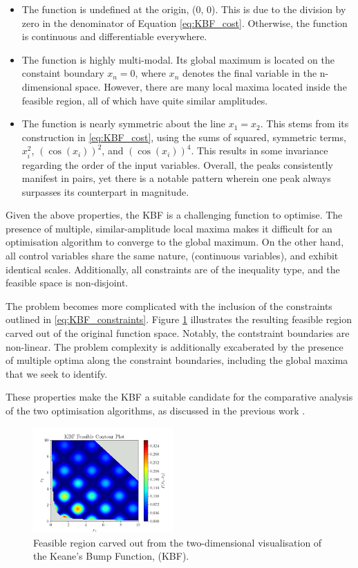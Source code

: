 \documentclass[10pt]{article}
\begin{document}
\begin{multicols}{2}
\begin{itemize}
    \item The function is undefined at the origin, (0, 0). This is due to the division by zero in the denominator of Equation \ref{eq:KBF_cost}. Otherwise, the function is continuous and differentiable everywhere.
    \item The function is highly multi-modal. Its global maximum is located on the constaint boundary $x_{n}=0$, where $x_n$ denotes the final variable in the n-dimensional space. However, there are many local maxima located inside the feasible region, all of which have quite similar amplitudes.
    \item The function is nearly symmetric about the line $x_1=x_2$. This stems from its construction in \ref{eq:KBF_cost}, using the sums of squared, symmetric terms, $x_i^2$, $(\cos(x_i))^2$, and $(\cos(x_i))^4$. This results in some invariance regarding the order of the input variables. Overall, the peaks consistently manifest in pairs, yet there is a notable pattern wherein one peak always surpasses its counterpart in magnitude.
\end{itemize}

Given the above properties, the KBF is a challenging function to optimise. The presence of multiple, similar-amplitude local maxima makes it difficult for an optimisation algorithm to converge to the global maximum. On the other hand, all control variables share the same nature, (continuous variables), and exhibit identical scales. Additionally, all constraints are of the inequality type, and the feasible space is non-disjoint.

The problem becomes more complicated with the inclusion of the constraints outlined in \ref{eq:KBF_constraints}. Figure \ref{fig:KBF_Feasible} illustrates the resulting feasible region carved out of the original function space. Notably, the contstraint boundaries are non-linear. The problem complexity is additionally excaberated by the presence of multiple optima along the constraint boundaries, including the global maxima that we seek to identify.

These properties make the KBF a suitable candidate for the comparative analysis of the two optimisation algorithms, as discussed in the previous work \cite{ELBELTAGY1999639}.

\begin{figure}[H]
    \centering
    \includegraphics[width=0.48\textwidth]{../figures/KBF/KBF Feasible_contour.png}
    \captionsetup{justification=centering}
    \caption{Feasible region carved out from the two-dimensional visualisation of the Keane's Bump Function, (KBF).}
    \label{fig:KBF_Feasible}
\end{figure}


\end{multicols}
\end{document}

